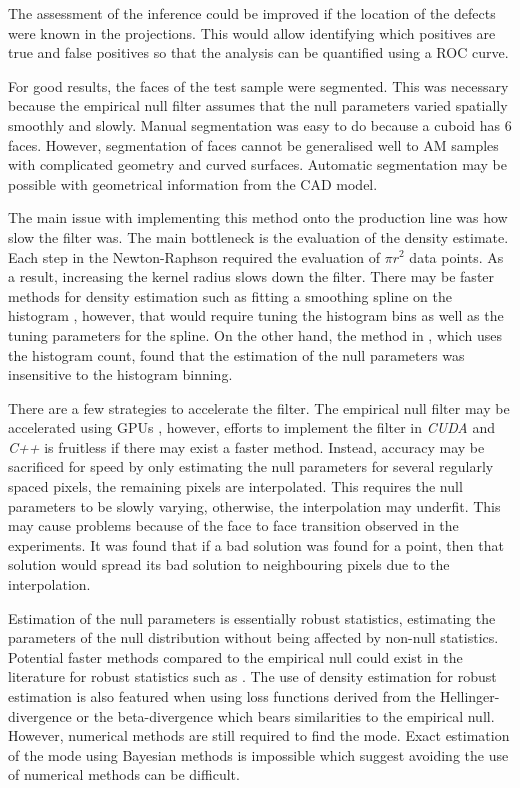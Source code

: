 The assessment of the inference could be improved if the location of the defects were known in the projections. This would allow identifying which positives are true and false positives so that the analysis can be quantified using a ROC curve.

For good results, the faces of the test sample were segmented. This was necessary because the empirical null filter assumes that the null parameters varied spatially smoothly and slowly. Manual segmentation was easy to do because a cuboid has 6 faces. However, segmentation of faces cannot be generalised well to AM samples with complicated geometry and curved surfaces. Automatic segmentation may be possible with geometrical information from the CAD model.

The main issue with implementing this method onto the production line was how slow the filter was. The main bottleneck is the evaluation of the density estimate. Each step in the Newton-Raphson required the evaluation of $\pi r^2$ data points. As a result, increasing the kernel radius slows down the filter. There may be faster methods for density estimation such as fitting a smoothing spline on the histogram \citep{efron2004large}, however, that would require tuning the histogram bins as well as the tuning parameters for the spline. On the other hand, the method in \cite{schwartzman2008empirical}, which uses the histogram count, found that the estimation of the null parameters was insensitive to the histogram binning.

There are a few strategies to accelerate the filter. The empirical null filter may be accelerated using GPUs \citep{yang2008parallel, hwu2011gpu, eklund2013medical}, however, efforts to implement the filter in \emph{CUDA} and \emph{C++} is fruitless if there may exist a faster method. Instead, accuracy may be sacrificed for speed by only estimating the null parameters for several regularly spaced pixels, the remaining pixels are interpolated. This requires the null parameters to be slowly varying, otherwise, the interpolation may underfit. This may cause problems because of the face to face transition observed in the experiments. It was found that if a bad solution was found for a point, then that solution would spread its bad solution to neighbouring pixels due to the interpolation.

Estimation of the null parameters is essentially robust statistics, estimating the parameters of the null distribution without being affected by non-null statistics. Potential faster methods compared to the empirical null could exist in the literature for robust statistics such as \cite{hampel1986robust, rousseeuw1987robust, maronna2006robust, huber2009robust, jewson2018principles}. The use of density estimation for robust estimation is also featured when using loss functions derived from the Hellinger-divergence \citep{beran1977minimum, jewson2018principles} or the beta-divergence \citep{basu1998robust, jewson2018principles} which bears similarities to the empirical null. However, numerical methods are still required to find the mode. Exact estimation of the mode using Bayesian methods is impossible \citep{heinrich2013the} which suggest avoiding the use of numerical methods can be difficult.

